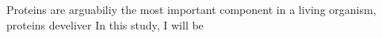 Proteins are arguabiliy the most important component in a living organism, proteins develiver   In this study, I will be 